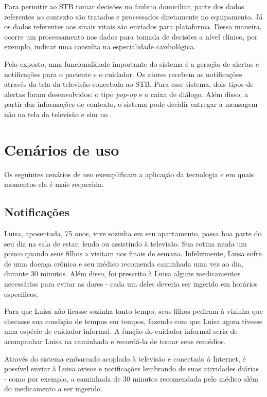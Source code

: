 Para permitir ao STB tomar decisões no âmbito domiciliar, parte dos dados
referentes ao contexto são tratados e processados diretamente no equipamento.
Já os dados referentes aos sinais vitais são enviados para plataforma. Dessa 
maneira, ocorre um processamento nos dados para tomada de decisões a nível
clínico, por exemplo, indicar uma consulta na especialidade cardiológica.

Pelo exposto, uma funcionalidade importante do sistema é a geração de alertas e
notificações para o paciente e o cuidador. Os atores recebem as notificações
através da tela da televisão conectada ao STB. Para esse sistema, dois tipos de
alertas foram desenvolvidos: o tipo \textit{pop-up} e o caixa de diálogo.
Além disso, a partir das informações de contexto, o sistema pode decidir
entregar a mensagem não na tela da televisão e sim no \smartphone.

\section{Cenários de uso} \label{sec:cenarios-de-uso}

Os seguintes cenários de uso exemplificam a aplicação da tecnologia e em quais
momentos ela é mais requerida.

\subsection{Notificações}\label{subsec:notificacoes}

Luisa, aposentada, 75 anos, vive sozinha em seu apartamento, passa boa parte do
seu dia na sala de estar, lendo ou assistindo à televisão. Sua rotina muda um
pouco quando seus filhos a visitam nos finais de semana. Infelizmente, Luisa
sofre de uma doença crônica e seu médico recomenda caminhada uma vez ao dia,
durante 30 minutos. Além disso, foi prescrito à Luisa alguns medicamentos
necessários para evitar as dores - cada um deles deveria ser ingerido em
horários específicos.

Para que Luisa não ficasse sozinha tanto tempo, seus filhos pediram à vizinha
que checasse sua condição de tempos em tempos, fazendo com que Luisa agora tivesse uma
espécie de cuidador informal. A função do cuidador informal seria de acompanhar
Luisa na caminhada e recordá-la de tomar seus remédios.

Através do sistema embarcado acoplado à televisão e conectado à Internet, é
possível enviar à Luisa avisos e notificações lembrando de suas atividades
diárias - como por exemplo, a caminhada de 30 minutos recomendada pelo
médico além do medicamento a ser ingerido.

